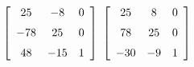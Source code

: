 {$\left[ \begin {array}{ccc} 25&-8&0\\\noalign{\medskip}-78&25&0
\\\noalign{\medskip}48&-15&1\end {array} \right]$ 
}
{$ \left[ \begin {array}{ccc} 25&8&0\\\noalign{\medskip}78&25&0
\\\noalign{\medskip}-30&-9&1\end {array} \right]$}
